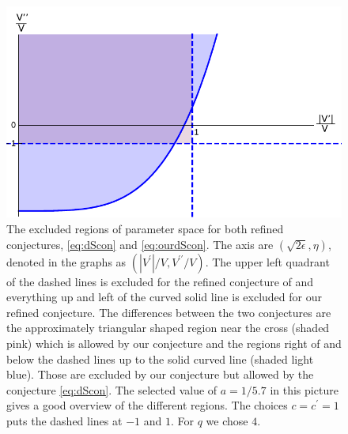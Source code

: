 \documentclass[a4paper,12pt,twoside,openright]{report}
\begin{document}
\begin{figure}[htp]
     \centering
     \includegraphics[width=0.9 \textwidth]{conreg3_mod.pdf}
     \caption{The excluded regions of parameter space for both refined conjectures, \eqref{eq:dScon} and \eqref{eq:ourdScon}. The axis are $(\sqrt{2\epsilon},\eta)$, denoted in the graphs as $(|V^ \prime|/V,V^ {\prime \prime}/V)$. The upper left quadrant of the dashed lines is excluded for the refined conjecture of \cite{Ooguri:2018wrx} and everything up and left of the curved solid line is excluded for our refined conjecture. The differences between the two conjectures are the approximately triangular shaped region near the cross (shaded pink) which is allowed by our conjecture and the regions right of and below the dashed lines up to the solid curved line (shaded light blue). Those are excluded by our conjecture but allowed by the conjecture \eqref{eq:dScon}. The selected value of $a = 1/5.7$ in this picture gives a good overview of the different regions. The choices $c=c^ \prime = 1$ puts the dashed lines at $-1$ and $1$. For $q$ we chose $4$.}
     \label{fig:conjreg}
\end{figure}
\end{document}
